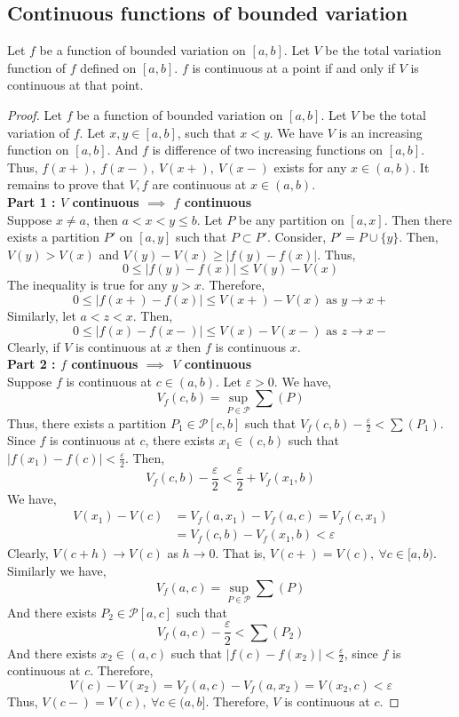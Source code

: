 \subsection{Continuous functions of bounded variation}
\begin{theorem}
	Let $f$ be a function of bounded variation on $[a,b]$. %
	Let $V$ be the total variation function of $f$ defined on $[a,b]$.
	$f$ is continuous at a point if and only if $V$ is continuous at that point.
\end{theorem}
\begin{proof}
	Let $f$ be a function of bounded variation on $[a,b]$.
	Let $V$ be the total variation of $f$.
	Let $x,y \in [a,b]$, such that $x<y$.
	We have $V$ is an increasing function on $[a,b]$.
	And $f$ is difference of two increasing functions on $[a,b]$.
	Thus, $f(x+),\ f(x-),\ V(x+),\ V(x-)$ exists for any $x \in (a,b)$.
	It remains to prove that $V,f$ are continuous at $x \in (a,b)$.\\

	\textbf{Part 1 : $V$ continuous $\implies$ $f$ continuous}\\
	Suppose $x \ne a$, then $a<x<y\le b$.
	Let $P$ be any partition on $[a,x]$.
	Then there exists a partition $P'$ on $[a,y]$ such that $P \subset P'$.
	Consider, $P' = P\cup\{y\}$.
	Then, $V(y) > V(x)$ and $V(y)-V(x) \ge |f(y)-f(x)|$.
	Thus,
	\[ 0 \le |f(y)-f(x)| \le V(y)-V(x) \]
	The inequality is true for any $y>x$.
	Therefore,
	\[ 0 \le |f(x+)-f(x)| \le V(x+)-V(x) \text{ as } y \to x+ \]
	Similarly, let $a<z<x$.
	Then,
	\[ 0 \le |f(x)-f(x-)| \le V(x)-V(x-) \text{ as } z \to x- \]
	Clearly, if $V$ is continuous at $x$ then $f$ is continuous $x$.\\

	\textbf{Part 2 : $f$ continuous $\implies$ $V$ continuous}\\
	Suppose $f$ is continuous at $c \in (a,b)$.
	Let $\varepsilon > 0$.
	We have,
	\[ V_f(c,b) = \sup_{P \in \mathscr{P}} \sum (P) \]
	Thus, there exists a partition $P_1 \in \mathscr{P}[c,b]$ such that $V_f(c,b) - \frac{\varepsilon}{2} < \sum (P_1)$.
	Since $f$ is continuous at $c$, there exists $x_1 \in (c,b)$ such that $|f(x_1)-f(c)| < \frac{\varepsilon}{2}$.
	Then,
	\[ V_f(c,b) - \frac{\varepsilon}{2} < \frac{\varepsilon}{2} + V_f(x_1,b) \]
	We have,
	\begin{align*}
		V(x_1)-V(c) & = V_f(a,x_1) - V_f(a,c) = V_f(c,x_1) \\
		& = V_f(c,b) - V_f(x_1,b) < \varepsilon
	\end{align*}
	Clearly, $V(c+h) \to V(c)$ as $h \to 0$.
	That is, $V(c+) = V(c),\ \forall c \in [a,b)$.
	Similarly we have,
	\[ V_f(a,c) = \sup_{P \in \mathscr{P}} \sum (P) \]
	And there exists $P_2 \in \mathscr{P}[a,c]$ such that
	\[ V_f(a,c) - \frac{\varepsilon}{2} < \sum (P_2) \]
	And there exists $x_2 \in (a,c)$ such that $|f(c)-f(x_2)| < \frac{\varepsilon}{2}$, since $f$ is continuous at $c$.
	Therefore,
	\[ V(c)-V(x_2) = V_f(a,c) - V_f(a,x_2) = V(x_2,c) < \varepsilon \]
	Thus, $V(c-) = V(c),\ \forall c \in (a,b]$.
	Therefore, $V$ is continuous at $c$.
\end{proof}
